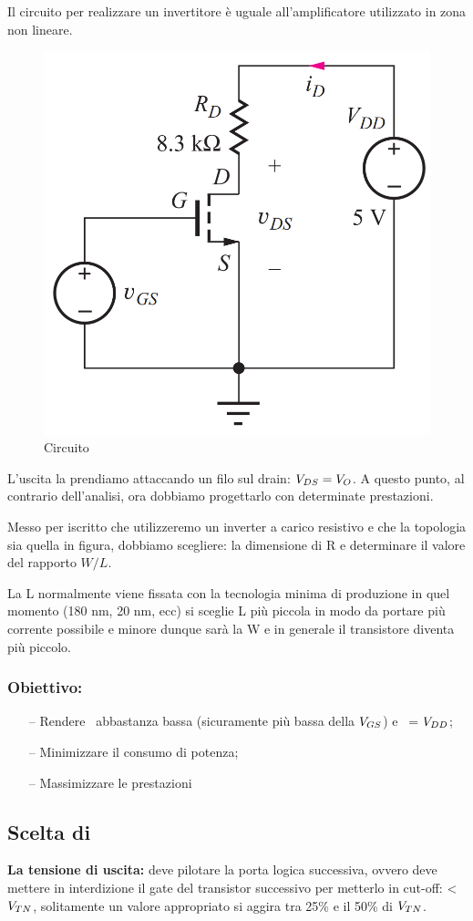 Il circuito per realizzare un invertitore è uguale all'amplificatore utilizzato in zona non lineare.

\begin{figure}[htbp]
    \centering
    \includegraphics[width=0.35\linewidth]{img/calcolo_retta_carico.png}
    \caption{Circuito}    
\end{figure}

L'uscita la prendiamo attaccando un filo sul drain: $V_{DS} = V_O$. A questo punto, al contrario dell'analisi, ora dobbiamo progettarlo con determinate prestazioni.

Messo per iscritto che utilizzeremo un inverter a carico resistivo e che la topologia sia quella in figura, dobbiamo scegliere: la dimensione di R e determinare il valore del rapporto $W/L$.

La L normalmente viene fissata con la tecnologia minima di produzione in quel momento (180 nm, 20 nm, ecc) si sceglie L più piccola in modo da portare più corrente possibile e minore dunque sarà la W e in generale il transistore diventa più piccolo.

\subsubsection{Obiettivo:}

\begin{itemize}
    \item[--] Rendere \vl $\,$ abbastanza bassa (sicuramente più bassa della $V_{GS}$) e \vh $\,$ = $V_{DD}$;
    \item[--] Minimizzare il consumo di potenza;
    \item [--] Massimizzare le prestazioni
\end{itemize}

\subsection{Scelta di \vl}

\textbf{La	tensione	di	uscita:}	deve	pilotare	la porta	logica	successiva, ovvero deve mettere in interdizione il gate del transistor successivo per metterlo in cut-off: \vl < $V_{TN}$, solitamente un valore appropriato si aggira tra 25\% e il 50\% di $V_{TN}$.

